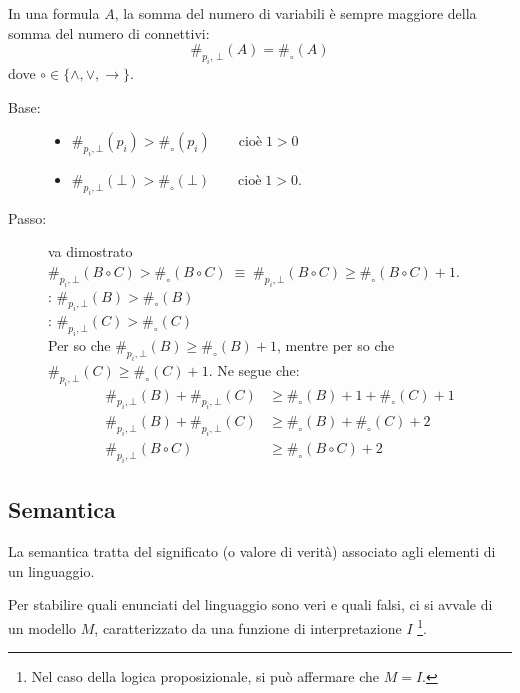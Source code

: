 \documentclass[a4paper,12pt]{article}
\newcommand{\latinmath}[1]{\text{\latinmodern{#1}}} %
\begin{document}
\begin{exm}
	 In una formula $A$, la somma del numero di variabili è sempre maggiore della somma del numero di connettivi:
	$$\#_{p_i, \, \bot}(A) = \#_{\circ}(A)$$
	dove $\circ \in \{\land, \lor, \to\}$. 
	\begin{dimo}
		 \phantom{ciao} 		
		\begin{description}
			\item [Base:] \phantom{ciao}
			\begin{itemize}
				\item $\#_{p_i, \bot}(p_i) > \#_{\circ}(p_i) \qquad \text{cioè} \; 1>0$ 
				\item $\#_{p_i, \bot}(\bot) > \#_{\circ}(\bot) \qquad \text{cioè} \; 1>0$.
			\end{itemize}
			\item [Passo:] va dimostrato $\#_{p_i, \bot}(B \circ C) > \#_{\circ}(B \circ C) \; \equiv \; \#_{p_i, \bot}(B \circ C) \geq \#_{\circ}(B \circ C) +1$. \\
			\latinmath{IH1}: $\#_{p_i, \bot}(B) > \#_{\circ}(B)$ \\
			\latinmath{IH2}: $\#_{p_i, \bot}(C) > \#_{\circ}(C)$ \\
				Per \latinmath{IH1} so che $\#_{p_i, \bot}(B) \geq \#_{\circ}(B) +1$, mentre per \latinmath{IH2} so che $\#_{p_i, \bot}(C) \geq \#_{\circ}(C) +1$. Ne segue che:
				$$\begin{aligned}
					\#_{p_i, \bot}(B) + \#_{p_i, \bot}(C) & \geq \#_{\circ}(B) +1 + \#_{\circ}(C) +1 \\ 
					\#_{p_i, \bot}(B) + \#_{p_i, \bot}(C) & \geq \#_{\circ}(B) + \#_{\circ}(C) +2 \\
					\#_{p_i, \bot}(B \circ C) & \geq \#_{\circ}(B \circ C) +2
				\end{aligned}$$
		\end{description}
	\end{dimo}
\end{exm}

\newpage
\subsection{Semantica}
\noindent La semantica tratta del significato (o valore di verità) associato agli elementi di un linguaggio. 

Per stabilire quali enunciati del linguaggio sono veri e quali falsi, ci si avvale di un modello $M$, caratterizzato da una funzione di interpretazione $I$ \footnote{Nel caso della logica proposizionale, si può affermare che $M = I$.}. \\
\end{document}
